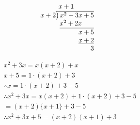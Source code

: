 \documentclass{article}
\begin{document}
\[
\begin{array}{r}
    x + 1\phantom{abcdef} \\
    x + 2{\overline{\smash{\big)}\,x^2 + 3x + 5\phantom{}}} \\
    \underline{\phantom{}x^2 + 2x\phantom{abc)}} \\
    \phantom{x^2 + }x + 5\phantom{} \\
    \underline{\phantom{}x + 2} \\
    \phantom{x^2 + 3}3\phantom{}
\end{array}
\]

$$
\begin{aligned}
& x^2+3x = x(x+2) + x \\
& x+5 = 1 \cdot (x+2) + 3 \\
& \therefore x = 1 \cdot (x+2) + 3 - 5 \\
& \therefore x^2 + 3x = x(x+2) + 1 \cdot (x+2) + 3 - 5 \\
& = (x+2)\{x+1\} + 3 - 5 \\
& \therefore x^2 + 3x + 5 = (x+2)(x+1) + 3
\end{aligned}
$$
\end{document}
